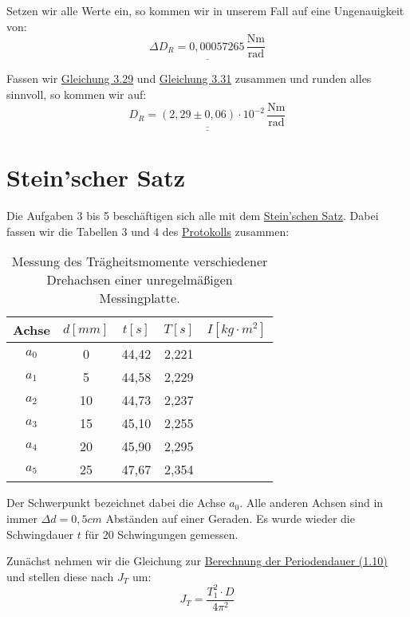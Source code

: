 Setzen wir alle Werte ein, so kommen wir in unserem Fall auf eine Ungenauigkeit von:
\begin{equation}
    \underline{\Delta D_R = 0,00057265 \, \mathrm{\frac{Nm}{rad}}}
    \label{eq:richtmoment_fehler}
\end{equation}

Fassen wir \hyperref[eq:richtmoment_berechnet]{Gleichung 3.29} und \hyperref[eq:richtmoment_fehler]{Gleichung 3.31} zusammen und runden alles sinnvoll, so kommen wir auf:
\begin{equation}
    \underline{\underline{D_R = (2,29 \pm 0,06) \cdot 10^{-2}\,\mathrm{\frac{Nm}{rad}}}}
\end{equation}


\section{Stein'scher Satz}
Die Aufgaben 3 bis 5 beschäftigen sich alle mit dem \hyperref[eq:steinsatz]{Stein'schen Satz}. 
Dabei fassen wir die Tabellen 3 und 4 des \hyperref[Protokoll]{Protokolls} zusammen:

\begin{table}[h!]
    \begin{tabular}{c | c | c | c |  c}
    Achse & $d [mm]$ & $t [s]$ & $T [s]$ & $I [kg \cdot m^2]$ \\
    \hline    
    $a_0$ &  0 & 44,42 & 2,221 \\ 
    $a_1$ &  5 & 44,58 & 2,229\\
    $a_2$ & 10 & 44,73 & 2,237\\
    $a_3$ & 15 & 45,10 & 2,255\\
    $a_4$ & 20 & 45,90 & 2,295\\
    $a_5$ & 25 & 47,67 & 2,354\\
    \hline
    \end{tabular}
    \caption{Messung des Trägheitsmomente verschiedener Drehachsen einer unregelmäßigen Messingplatte.}
    \label{tab:unregelmäßige_messingplatte}
\end{table}

Der Schwerpunkt bezeichnet dabei die Achse $a_0$. Alle anderen Achsen sind in immer $\Delta d = 0,5cm$ Abständen auf einer Geraden.
Es wurde wieder die Schwingdauer $t$ für 20 Schwingungen gemessen. 

Zunächst nehmen wir die Gleichung zur \hyperref[eq:T_def]{Berechnung der Periodendauer (1.10)} und stellen diese nach $J_T$ um:
\begin{equation}
    J_T = \frac{T_1^2 \cdot D}{4\pi^2}
    \label{eq:j_t}
\end{equation}

